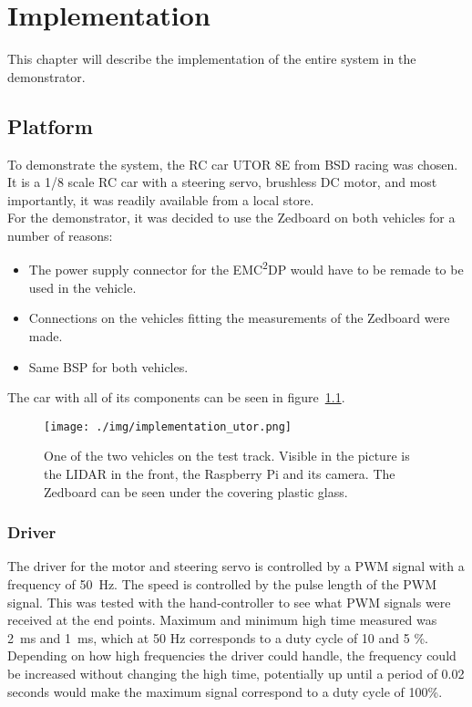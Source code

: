 \chapter{Implementation}
This chapter will describe the implementation of the entire system in the demonstrator.

\section{Platform}
To demonstrate the system, the RC car UTOR 8E from BSD racing was chosen. It is a 1/8 scale RC car with a steering servo, brushless DC motor, and most importantly, it was readily available from a local store.\\

For the demonstrator, it was decided to use the Zedboard on both vehicles for a number of reasons:
\begin{itemize}
\item The power supply connector for the EMC\textsuperscript{2}DP would have to be remade to be used in the vehicle.
\item Connections on the vehicles fitting the measurements of the Zedboard were made.
\item Same BSP for both vehicles.
\end{itemize}

The car with all of its components can be seen in figure~\ref{fig:utor_overview}.

\begin{figure}[H]
\centering
\texttt{[image: ./img/implementation\_utor.png]}
\caption{One of the two vehicles on the test track. Visible in the picture is the LIDAR in the front, the Raspberry Pi and its camera. The Zedboard can be seen under the covering plastic glass.}
\label{fig:utor_overview}
\end{figure}

\subsection{Driver}
The driver for the motor and steering servo is controlled by a PWM signal with a frequency of 50~Hz. The speed is controlled by the pulse length of the PWM signal. This was tested with the hand-controller to see what PWM signals were received at the end points. Maximum and minimum high time measured was 2~ms and 1~ms, which at 50 Hz corresponds to a duty cycle of 10 and 5 \%. Depending on how high frequencies the driver could handle, the frequency could be increased without changing the high time, potentially up until a period of 0.02 seconds would make the maximum signal correspond to a duty cycle of 100\%.\\

